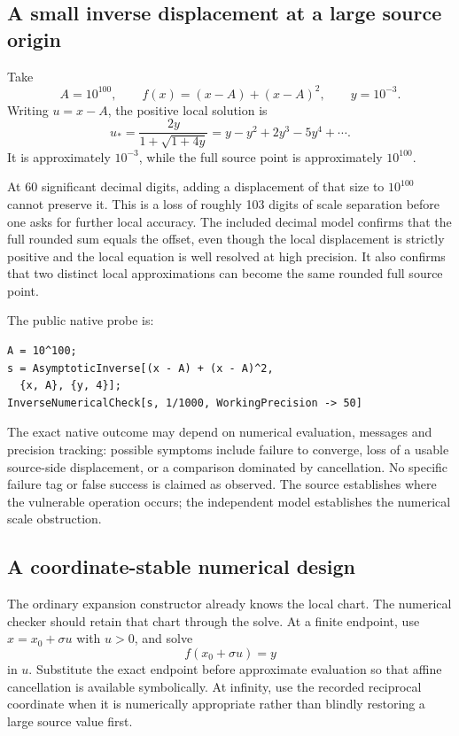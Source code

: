 \documentclass[11pt,a4paper]{article}
\begin{document}
\subsection{A small inverse displacement at a large source origin}

Take
\begin{equation}\label{eq:numeric-source}
 A=10^{100},\qquad f(x)=(x-A)+(x-A)^2,\qquad y=10^{-3}.
\end{equation}
Writing $u=x-A$, the positive local solution is
\begin{equation}\label{eq:numeric-root}
 u_* = \frac{2y}{1+\sqrt{1+4y}}
      =y-y^2+2y^3-5y^4+\cdots.
\end{equation}
It is approximately $10^{-3}$, while the full source point is approximately $10^{100}$.

At 60 significant decimal digits, adding a displacement of that size to $10^{100}$ cannot preserve it. This is a loss of roughly 103 digits of scale separation before one asks for further local accuracy. The included decimal model confirms that the full rounded sum equals the offset, even though the local displacement is strictly positive and the local equation is well resolved at high precision. It also confirms that two distinct local approximations can become the same rounded full source point.

The public native probe is:
\begin{lstlisting}
A = 10^100;
s = AsymptoticInverse[(x - A) + (x - A)^2,
  {x, A}, {y, 4}];
InverseNumericalCheck[s, 1/1000, WorkingPrecision -> 50]
\end{lstlisting}
The exact native outcome may depend on numerical evaluation, messages and precision tracking: possible symptoms include failure to converge, loss of a usable source-side displacement, or a comparison dominated by cancellation. No specific failure tag or false success is claimed as observed. The source establishes where the vulnerable operation occurs; the independent model establishes the numerical scale obstruction.

\subsection{A coordinate-stable numerical design}

The ordinary expansion constructor already knows the local chart. The numerical checker should retain that chart through the solve. At a finite endpoint, use $x=x_0+\sigma u$ with $u>0$, and solve
\begin{equation}
 f(x_0+\sigma u)=y
\end{equation}
in $u$. Substitute the exact endpoint before approximate evaluation so that affine cancellation is available symbolically. At infinity, use the recorded reciprocal coordinate when it is numerically appropriate rather than blindly restoring a large source value first.
\end{document}

